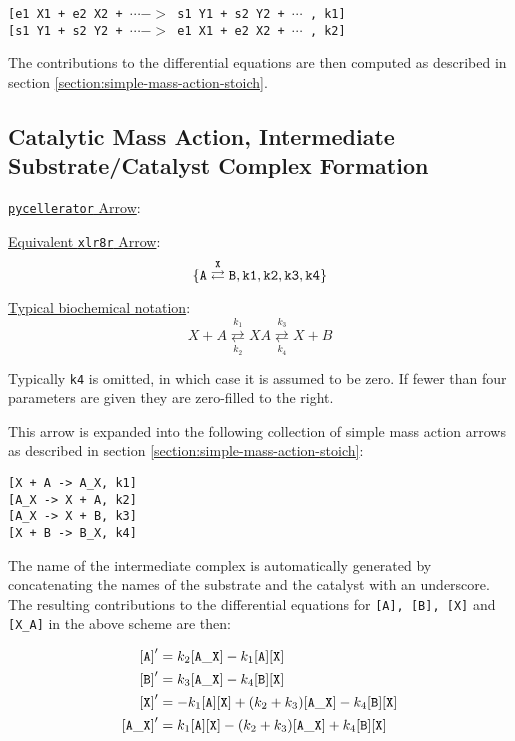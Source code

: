 \begin{center}
{\tt [e1 X1 + e2 X2 + $\cdots ->$ s1 Y1 + s2 Y2 + $\cdots$ , k1]}\\
{\tt [s1 Y1 + s2 Y2 + $\cdots ->$ e1 X1 + e2 X2 + $\cdots$  , k2]}
\end{center}

The contributions to the differential equations are then computed as described in section \ref{section:simple-mass-action-stoich}.

\subsection{Catalytic Mass Action, Intermediate Substrate/Catalyst Complex Formation}
\label{section:cat-mass-action}

\underline{{\tt pycellerator} Arrow}: \begin{center}
\fbox{\tt 
[A => B, mod[X], rates[k1, k2, k3, k4]]
} 
\end{center}
\underline{Equivalent {\tt xlr8r} Arrow}:
$$\tt\{A \overset{X}{\rightleftarrows} B,k1,k2,k3,k4 \}$$

\underline{Typical biochemical notation}: 
$$ X+A\underset{k_2}{\overset{k_1}  \rightleftarrows } XA \underset{k_4}{ \overset{k_3}{\rightleftarrows}} X+B$$

Typically {\tt k4} is omitted, in which case it is assumed to be zero. If fewer than four parameters are given they are zero-filled to the right. 

This arrow is expanded into the following collection of simple mass action arrows as described in section \ref{section:simple-mass-action-stoich}:

\begin{center}
{\tt [X + A -> A\_X, k1]}\\
{\tt [A\_X -> X + A, k2]}\\
{\tt [A\_X -> X + B, k3]}\\
{\tt [X + B -> B\_X, k4]}
\end{center}

The name of the intermediate complex is automatically generated by concatenating the names of the substrate and the catalyst with an underscore. The resulting contributions to the differential equations for {\tt [A], [B], [X]} and {\tt [X\_A]} in the above scheme are then: 

\begin{align*}
{\tt [A]}'&=k_2 {\tt [A\_X]} - k_1 {\tt [A][X]}\\
{\tt [B]}'&=k_3 {\tt [A\_X]} -  k_4 {\tt [B][X]}\\
{\tt [X]}'&=-k_1 {\tt [A][X]} + (k_2+k_3) {\tt [A\_X]}- k_4 {\tt [B][X]}\\
{\tt [A\_X]}'&= k_1 {\tt [A][X]} - (k_2 + k_3) {\tt [A\_X]} + k_4 {\tt [B][X]}
\end{align*}

